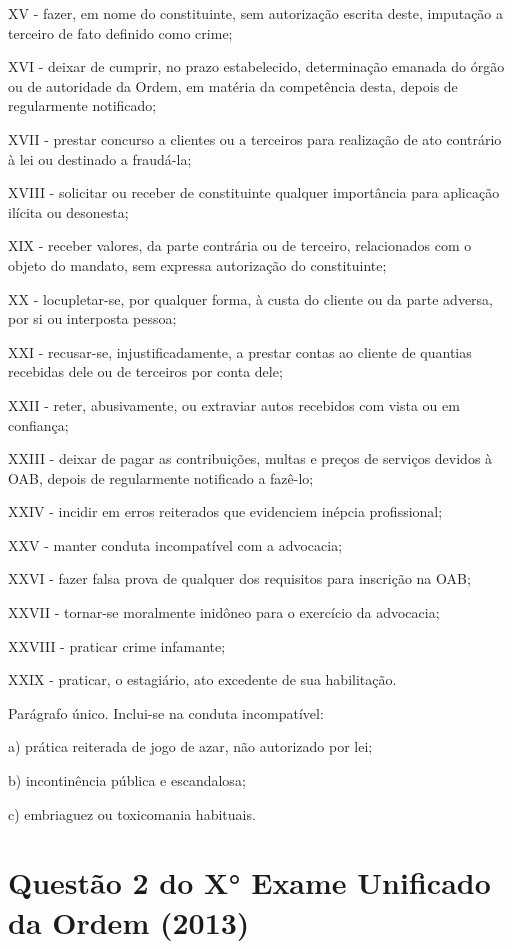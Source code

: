 \documentclass[12pt]{article}
\begin{document}
XV - fazer, em nome do constituinte, sem autorização escrita deste, imputação a terceiro de fato definido como crime;

XVI - deixar de cumprir, no prazo estabelecido, determinação emanada do órgão ou de autoridade da Ordem, em matéria da competência desta, depois de regularmente notificado;

XVII - prestar concurso a clientes ou a terceiros para realização de ato contrário à lei ou destinado a fraudá-la;

XVIII - solicitar ou receber de constituinte qualquer importância para aplicação ilícita ou desonesta;

XIX - receber valores, da parte contrária ou de terceiro, relacionados com o objeto do mandato, sem expressa autorização do constituinte;

XX - locupletar-se, por qualquer forma, à custa do cliente ou da parte adversa, por si ou interposta pessoa;

XXI - recusar-se, injustificadamente, a prestar contas ao cliente de quantias recebidas dele ou de terceiros por conta dele;

XXII - reter, abusivamente, ou extraviar autos recebidos com vista ou em confiança;

XXIII - deixar de pagar as contribuições, multas e preços de serviços devidos à OAB, depois de regularmente notificado a fazê-lo;

XXIV - incidir em erros reiterados que evidenciem inépcia profissional;

XXV - manter conduta incompatível com a advocacia;

XXVI - fazer falsa prova de qualquer dos requisitos para inscrição na OAB;

XXVII - tornar-se moralmente inidôneo para o exercício da advocacia;

XXVIII - praticar crime infamante;

XXIX - praticar, o estagiário, ato excedente de sua habilitação.

Parágrafo único. Inclui-se na conduta incompatível:

a) prática reiterada de jogo de azar, não autorizado por lei;

b) incontinência pública e escandalosa;

c) embriaguez ou toxicomania habituais.


\section{Questão 2 do X° Exame Unificado da Ordem (2013)}
\end{document}
